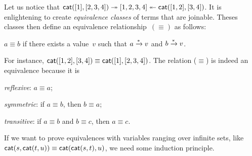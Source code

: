 Let us notice that \(\textsf{cat}([1], [2,3,4]) \twoheadrightarrow
[1,2,3,4] \twoheadleftarrow \textsf{cat}([1,2],
[3,4])\). It is enlightening to create
\emph{equivalence classes} of terms that are joinable. Theses classes
then define an equivalence relationship~\((\equiv)\)
 as follows:
\begin{center}
  \(a \equiv b\) if there exists a value~\(v\) such that \(a
  \xrightarrow{\smash[t]{*}} v\) and \(b \xrightarrow{\smash{*}} v\).
\end{center}
For instance, \(\textsf{cat}([1,2], [3,4]) \equiv \textsf{cat}([1],
[2,3,4])\). The relation (\(\equiv\)) is indeed an equivalence
because it is
\begin{itemize*}

  \item \emph{reflexive}: \(a \equiv a\);

  \item \emph{symmetric}: if \(a \equiv b\), then \(b \equiv a\);

  \item \emph{transitive}: if \(a \equiv b\) and \(b \equiv c\), then
    \(a \equiv c\).

\end{itemize*}

If we want to prove equivalences with variables ranging over
infinite sets, like \(\textsf{cat}(s,\textsf{cat}(t,u)) \equiv
\textsf{cat}(\textsf{cat}(s,t),u)\), we need some
induction principle.


\label{par:well-founded}


